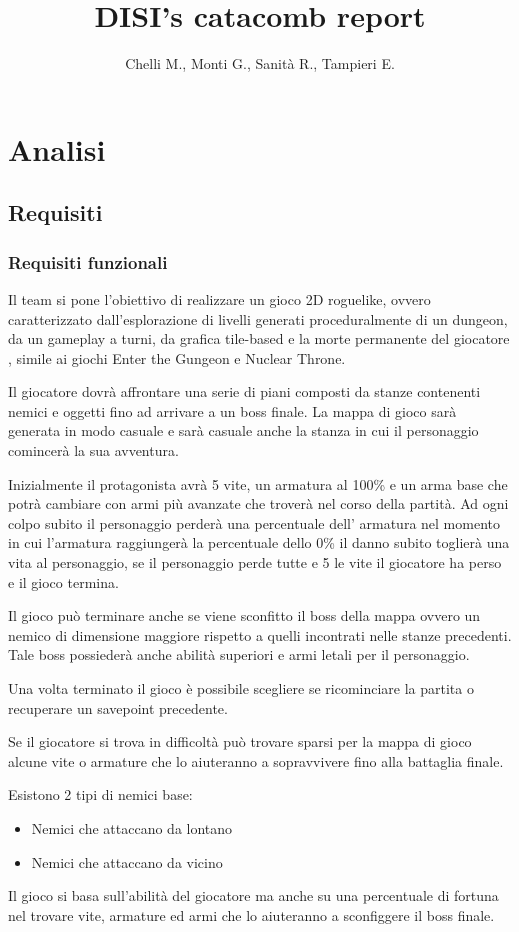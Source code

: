 \documentclass[a4paper,12pt]{report}
\title{DISI's catacomb report}
\author{Chelli M., Monti G., Sanità R., Tampieri E.}
\begin{document}
    \maketitle
    \tableofcontents
    \chapter{Analisi}
    \section{Requisiti}
    \subsection{Requisiti funzionali}
    \par Il team si pone l'obiettivo di realizzare un gioco 2D roguelike,
    ovvero caratterizzato dall'esplorazione di livelli generati proceduralmente
    di un dungeon, da un gameplay a turni, da grafica tile-based e la morte
    permanente del giocatore \cite{wiki:Roguelike}, simile ai giochi Enter the
    Gungeon e Nuclear Throne.
    \par Il giocatore dovrà affrontare una serie di piani composti da stanze contenenti
    nemici e oggetti fino ad arrivare a un boss finale. La mappa di gioco sarà generata
    in modo casuale e sarà casuale anche la stanza in cui il personaggio comincerà
    la sua avventura.
    \par Inizialmente il protagonista avrà 5 vite, un armatura al 100\%
    e un arma base che potrà cambiare con armi più avanzate che troverà nel corso
    della partità. Ad ogni colpo subito il personaggio perderà una percentuale dell'
    armatura nel momento in cui l'armatura raggiungerà la percentuale dello 0\%
    il danno subito toglierà una vita al personaggio, se il personaggio perde tutte
    e 5 le vite il giocatore ha perso e il gioco termina.
    \par Il gioco può terminare anche se viene sconfitto il boss della mappa ovvero
    un nemico di dimensione maggiore rispetto a quelli incontrati nelle stanze precedenti.
    Tale boss possiederà anche abilità superiori e armi letali per il personaggio.
    \par Una volta terminato il gioco è possibile scegliere se ricominciare la partita
    o recuperare un savepoint precedente.
    \par Se il giocatore si trova in difficoltà può trovare sparsi per la mappa di gioco
    alcune vite o armature che lo aiuteranno a sopravvivere fino alla battaglia finale.
    \par Esistono 2 tipi di nemici base:
    \begin{itemize}
        \item Nemici che attaccano da lontano
        \item Nemici che attaccano da vicino
    \end{itemize}
    \par Il gioco si basa sull'abilità del giocatore ma anche su una percentuale di
    fortuna nel trovare vite, armature ed armi che lo aiuteranno a sconfiggere il
    boss finale.
\end{document}
